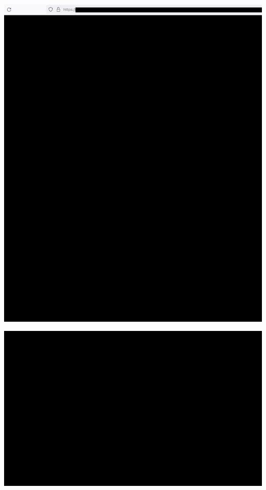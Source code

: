 \begin{center}
    \includegraphics[width=40em]{approved-p1_public}
\end{center}
\WillContinue
\pagebreak

\Continuing
\begin{center}
    \includegraphics[width=40em]{approved-p2_public}
\end{center}
\pagebreak

